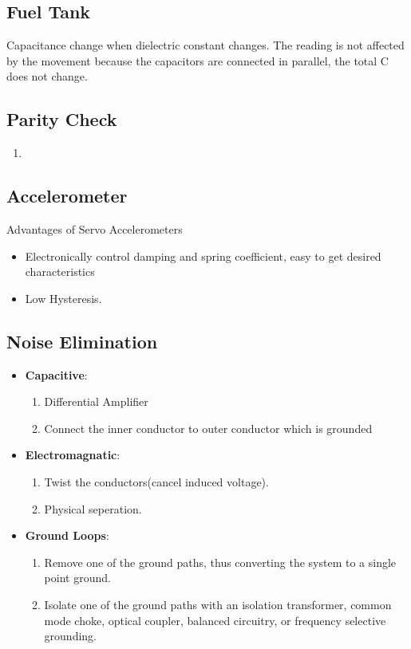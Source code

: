 \documentclass{article}
\begin{document}
	\subsection{Fuel Tank}
	Capacitance change when dielectric constant changes. The reading is not affected by the movement because the capacitors are connected in parallel, the total C does not change.
	
	
	\subsection{Parity Check}
	\begin{enumerate}
		\item 
	\end{enumerate}
	
	
	\subsection{Accelerometer}
	Advantages of Servo Accelerometers
	\begin{itemize}
		\item Electronically control damping and spring coefficient, easy to get desired characteristics
		\item Low Hysteresis.
	\end{itemize}
	
	\subsection{Noise Elimination}
	\begin{itemize}
		\item \textbf{Capacitive}: \begin{enumerate}
			\item Differential Amplifier
			\item Connect the inner conductor to outer conductor which is grounded
		\end{enumerate}
		
		\item \textbf{Electromagnatic}: \begin{enumerate}
			\item Twist the conductors(cancel induced voltage).
			\item Physical seperation.
		\end{enumerate}
		
		\item \textbf{Ground Loops}: \begin{enumerate}
			\item Remove one of the ground paths, thus converting the system to a single point ground.
			
			\item Isolate one of the ground paths with an isolation transformer, common mode choke, optical coupler, balanced circuitry, or frequency selective grounding.
		\end{enumerate}
	\end{itemize}
\end{document}
